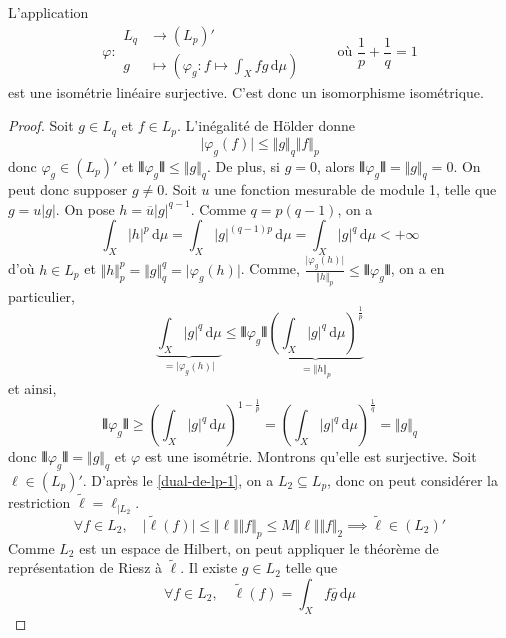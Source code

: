 
	\begin{theorem}
		L'application
		\[
		\varphi :
		\begin{array}{ll}
			L_q &\rightarrow (L_p)' \\
			g &\mapsto \left( \varphi_g : f \mapsto \int_X f g \, \mathrm{d}\mu \right)
		\end{array}
		\qquad \text{ où } \frac{1}{p} + \frac{1}{q} = 1
		\]
		est une isométrie linéaire surjective. C'est donc un isomorphisme isométrique.
	\end{theorem}

	\begin{proof}
		Soit $g \in L_q$ et $f \in L_p$. L'inégalité de Hölder donne
		\[ \vert \varphi_g(f) \vert \leq \Vert g \Vert_q \Vert f \Vert_p \]
		donc $\varphi_g \in (L_p)'$ et $\VERT \varphi_g \VERT \leq \Vert g \Vert_q$. De plus, si $g = 0$, alors $\VERT \varphi_g \VERT = \Vert g \Vert_q = 0$. On peut donc supposer $g \neq 0$.
		\newpar
	 	Soit $u$ une fonction mesurable de module 1, telle que $g = u \vert g \vert$. On pose $h = \overline{u} \vert g \vert^{q-1}$. Comme $q = p(q-1)$, on a
		\[ \int_X \vert h \vert^p \, \mathrm{d}\mu = \int_X \vert g \vert^{(q-1)p} \, \mathrm{d}\mu = \int_X \vert g \vert^{q} \, \mathrm{d}\mu < + \infty \]
		d'où $h \in L_p$ et $\Vert h \Vert_p^p = \Vert g \Vert_q^q = \vert \varphi_g(h) \vert$. Comme, $\frac{\vert \varphi_g(h) \vert}{\Vert h \Vert_p} \leq \VERT \varphi_g \VERT$, on a en particulier,
		\[ \underbrace{\int_X \vert g \vert^{q} \, \mathrm{d}\mu}_{= \vert \varphi_g(h) \vert} \leq \VERT \varphi_g \VERT \underbrace{\left ( \int_X \vert g \vert^{q} \, \mathrm{d}\mu \right )^{\frac{1}{p}}}_{= \Vert h \Vert_p} \]
		et ainsi,
		\[ \VERT \varphi_g \VERT \geq \left ( \int_X \vert g \vert^{q} \, \mathrm{d}\mu \right )^{1 - \frac{1}{p}} = \left ( \int_X \vert g \vert^{q} \, \mathrm{d}\mu \right )^{\frac{1}{q}} = \Vert g \Vert_q \]
		donc $\VERT \varphi_g \VERT = \Vert g \Vert_q$ et $\varphi$ est une isométrie.
		\newpar
		Montrons qu'elle est surjective. Soit $\ell \in (L_p)'$. D'après le \cref{dual-de-lp-1}, on a $L_2 \subseteq L_p$, donc on peut considérer la restriction $\widetilde{\ell} = \ell_{| L_2}$.
		\[ \forall f \in L_2, \quad \vert \widetilde{\ell}(f) \vert \leq \Vert \ell \Vert \Vert f \Vert_p \leq M \Vert \ell \Vert \Vert f \Vert_2 \implies \widetilde{\ell} \in (L_2)' \]
		Comme $L_2$ est un espace de Hilbert, on peut appliquer le théorème de représentation de Riesz à $\widetilde{\ell}$. Il existe $g \in L_2$ telle que
		\[ \forall f \in L_2, \quad \widetilde{\ell}(f) = \int_X f \overline{g} \, \mathrm{d}\mu \]

\end{proof}
